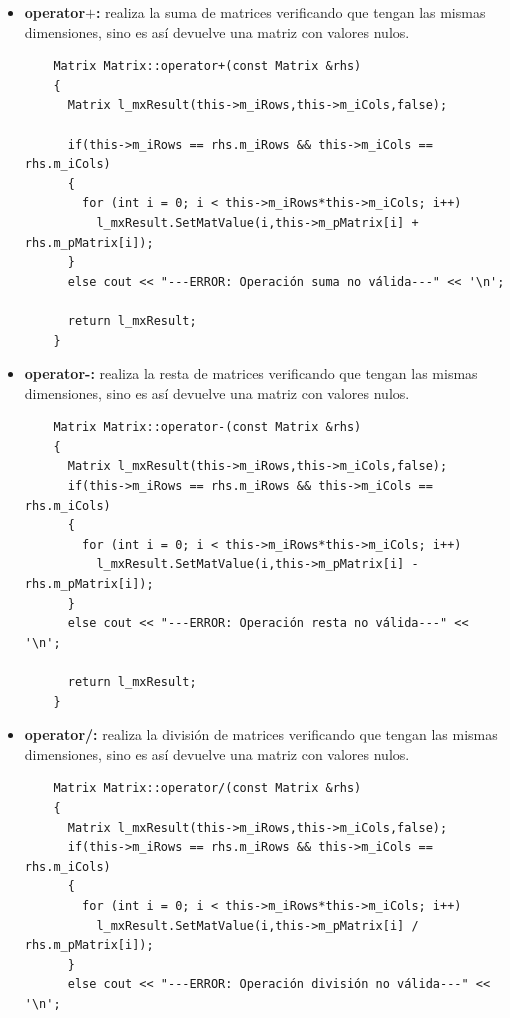 \begin{itemize}
    \item \textbf{operator$+$:} realiza la suma de matrices verificando que tengan las mismas dimensiones, sino es así devuelve una matriz con valores nulos. 
    
    \begin{verbatim}
    Matrix Matrix::operator+(const Matrix &rhs)
    {
      Matrix l_mxResult(this->m_iRows,this->m_iCols,false);
    
      if(this->m_iRows == rhs.m_iRows && this->m_iCols == rhs.m_iCols)
      {
        for (int i = 0; i < this->m_iRows*this->m_iCols; i++)
          l_mxResult.SetMatValue(i,this->m_pMatrix[i] + rhs.m_pMatrix[i]);
      }
      else cout << "---ERROR: Operación suma no válida---" << '\n';
    
      return l_mxResult;
    }

    \end{verbatim}
    
    \item \textbf{operator-:} realiza la resta de matrices verificando que tengan las mismas dimensiones, sino es así devuelve una matriz con valores nulos. 
    
    \begin{verbatim}
    Matrix Matrix::operator-(const Matrix &rhs)
    {
      Matrix l_mxResult(this->m_iRows,this->m_iCols,false);
      if(this->m_iRows == rhs.m_iRows && this->m_iCols == rhs.m_iCols)
      {
        for (int i = 0; i < this->m_iRows*this->m_iCols; i++)
          l_mxResult.SetMatValue(i,this->m_pMatrix[i] - rhs.m_pMatrix[i]);
      }
      else cout << "---ERROR: Operación resta no válida---" << '\n';
    
      return l_mxResult;
    }
    \end{verbatim}
    
    \item \textbf{operator/:} realiza la división de matrices verificando que tengan las mismas dimensiones, sino es así devuelve una matriz con valores nulos. 
    
    \begin{verbatim}
    Matrix Matrix::operator/(const Matrix &rhs)
    {
      Matrix l_mxResult(this->m_iRows,this->m_iCols,false);
      if(this->m_iRows == rhs.m_iRows && this->m_iCols == rhs.m_iCols)
      {
        for (int i = 0; i < this->m_iRows*this->m_iCols; i++)
          l_mxResult.SetMatValue(i,this->m_pMatrix[i] / rhs.m_pMatrix[i]);
      }
      else cout << "---ERROR: Operación división no válida---" << '\n';
    

\end{verbatim}
\end{itemize}
